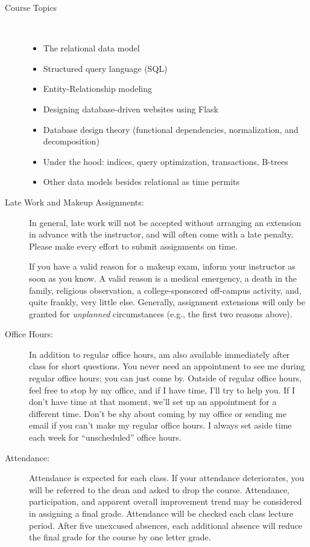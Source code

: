 \documentclass [letterpaper,11pt]{article}
\begin{document}
\begin{description}
\item[Course Topics]\
        \begin{itemize}
                \item The relational data model
                \item Structured query language (SQL)
                \item Entity-Relationship modeling 
                \item Designing database-driven websites using Flask
                \item Database design theory (functional dependencies, normalization, and decomposition)
                \item Under the hood: indices, query optimization, transactions, B-trees
                \item Other data models besides relational as time permits
\end{itemize}

\item[Late Work and Makeup Assignments:]
In general, late work will not be accepted without arranging an extension in advance
with the instructor, and will often come with a late penalty.
Please make every effort to submit assignments on time.

If you have a valid reason for a makeup exam, inform your instructor
   as soon as you know.  A valid reason is a medical emergency, a death in the family, 
   religious observation, a college-sponsored off-campus activity, and, quite frankly, 
   very little else.  Generally, assignment extensions will only be granted for 
   \emph{unplanned} circumstances (e.g., the first two reasons above). 

\item[Office Hours:]
In addition to regular office hours, am also available immediately after class for 
short questions.  You never need an appointment to see me during regular office hours; you
can just come by.  Outside of regular office hours, feel free to stop by my office,
and if I have time, I'll try to help you.  If I don't have time at that moment, we'll set up an
appointment for a different time.
Don't be shy about coming by my office or sending me email
if you can't make my regular office hours.  I always set aside time each week for ``unscheduled'' office hours.

\item[Attendance:]
Attendance is expected for each class. If your attendance deteriorates, you will be referred to the dean and asked to drop the course. Attendance, participation, and apparent overall improvement trend may be considered in assigning a final grade.
Attendance will be checked each class lecture period.  After five unexcused absences, each additional absence will reduce the final grade for the course by one letter grade.


\end{description}
\end{document}
